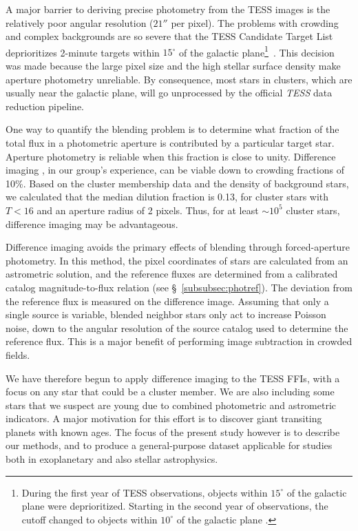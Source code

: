 \documentclass[12pt,twocolumn,tighten,trackchanges]{aastex62}
\begin{document}
A major barrier to deriving precise photometry from the TESS images is
the relatively poor angular resolution ($21''$ per pixel).   The
problems with crowding and complex backgrounds are so severe that the
TESS Candidate Target List deprioritizes 2-minute targets within
$15^\circ$ of the galactic plane\footnote{During the first year of
TESS observations, objects within $15^\circ$ of the galactic plane
were deprioritized. Starting in the second year of observations, the
cutoff changed to objects within $10^\circ$ of the galactic plane
\citep{stassun_TIC8_2019}.}~\citep{stassun_TIC_2018,stassun_TIC8_2019}.
This decision was made because the large pixel size and the high
stellar surface density make aperture photometry unreliable. 
By consequence, most stars in clusters, which are usually near
the galactic plane, will go unprocessed by the official {\it TESS}
data reduction pipeline.

One way to quantify the blending problem is to determine what fraction
of the total flux in a photometric aperture is contributed by a
particular target star. Aperture photometry is reliable when this
fraction is close to unity.  Difference imaging
\citep{Alard_Lupton_1998,miller_optimal_2008}, in our group's
experience, can be viable down to crowding fractions of 10\%.  Based
on the \citet{Kharchenko_et_al_2013} cluster membership data and the
density of background stars, we calculated that the median dilution
fraction is 0.13, for cluster stars with $T< 16$ and an aperture
radius of 2 pixels.  Thus, for at least $\sim$$10^5$ cluster stars,
difference imaging may be advantageous.

Difference imaging avoids the primary effects of blending through
forced-aperture photometry.  In this method, the pixel coordinates of
stars are calculated from an astrometric solution, and the reference
fluxes are determined from a calibrated catalog magnitude-to-flux
relation (see \S~\ref{subsubsec:photref}).  The deviation from the
reference flux is measured on the difference image.  Assuming that
only a single source is variable, blended neighbor stars only act to
increase Poisson noise, down to the angular resolution of the source
catalog used to determine the reference flux.  This is a major benefit
of performing image subtraction in crowded fields.

We have therefore begun to apply difference imaging to the TESS
FFIs, with a focus on any star that could be a cluster member.
We are also including some stars that we suspect are young due to
combined photometric and astrometric indicators.  A major motivation
for this effort is to discover giant transiting planets with known
ages.  The focus of the present study however is to describe our
methods, and to produce a general-purpose dataset applicable for
studies both in exoplanetary and also stellar astrophysics.
\end{document}
